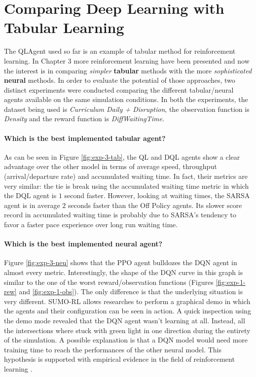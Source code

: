 \section{Comparing Deep Learning with Tabular Learning}

The QLAgent used so far is an example of tabular method for reinforcement learning.
In Chapter 3 more reinforcement learning have been presented and now the interest is in comparing \textit{simpler} \textbf{tabular} methods with the more \textit{sophisticated} \textbf{neural} methods.
In order to evaluate the potential of those approaches, two distinct experiments were conducted comparing the different tabular/neural agents available on the same simulation conditions.
In both the experiments, the dataset being used is \textit{Curriculum Daily + Disruption}, the observation function is \textit{Density} and the reward function is \textit{DiffWaitingTime}.

\paragraph{Which is the best implemented tabular agent?}

As can be seen in Figure \ref{fig:exp-3-tab}, the QL and DQL agents show a clear advantage over the other model in terms of average speed, throughput (arrival/departure rate) and accumulated waiting time.
In fact, their metrics are very similar: the tie is break using the accumulated waiting time metric in which the DQL agent is $1$ second faster.
However, looking at waiting times, the SARSA agent is in average $2$ seconds faster than the Off Policy agents.
Its slower score record in accumulated waiting time is probably due to SARSA's tendency to favor a faster pace experience over long run waiting time.


\paragraph{Which is the best implemented neural agent?}

Figure \ref{fig:exp-3-neu} shows that the PPO agent bulldozes the DQN agent in almost every metric.
Interestingly, the shape of the DQN curve in this graph is similar to the one of the worst reward/observation functions (Figures \ref{fig:exp-1-rew} and \ref{fig:exp-1-obs}).
The only difference is that the underlying situation is very different.
SUMO-RL allows researches to perform a graphical demo in which the agents and their configuration can be seen in action.
A quick inspection using the demo mode revealed that the DQN agent wasn't learning at all.
Instead, all the intersections where stuck with green light in one direction during the entirety of the simulation.
A possible explanation is that a DQN model would need more training time to reach the performances of the other neural model.
This hypothesis is supported with empirical evidence in the field of reinforcement learning \cite{kozlica2023deep}.

